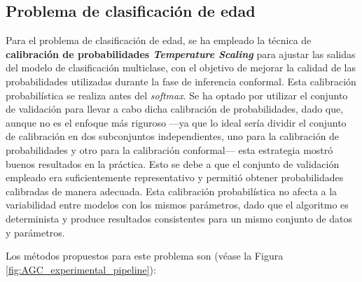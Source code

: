 
\subsection{Problema de clasificación de edad}




Para el problema de clasificación de edad, se ha empleado la técnica de \textbf{calibración de probabilidades \textit{Temperature Scaling}} para ajustar las salidas del modelo de clasificación multiclase, con el objetivo de mejorar la calidad de las probabilidades utilizadas durante la fase de inferencia conformal. Esta calibración probabilística se realiza antes del \textit{softmax}. Se ha optado por utilizar el conjunto de validación para llevar a cabo dicha calibración de probabilidades, dado que, aunque no es el enfoque más riguroso ---ya que lo ideal sería dividir el conjunto de calibración en dos subconjuntos independientes, uno para la calibración de probabilidades y otro para la calibración conformal--- esta estrategia mostró buenos resultados en la práctica. Esto se debe a que el conjunto de validación empleado era suficientemente representativo y permitió obtener probabilidades calibradas de manera adecuada. Esta calibración probabilística no afecta a la variabilidad entre modelos con los mismos parámetros, dado que el algoritmo es determinista y produce resultados consistentes para un mismo conjunto de datos y parámetros. 

Los métodos propuestos para este problema son (véase la Figura \ref{fig:AGC_experimental_pipeline}):

